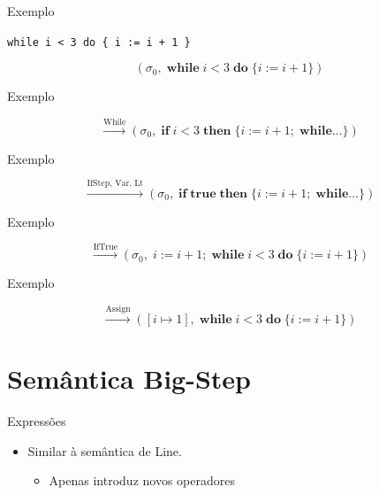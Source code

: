 \begin{frame}[fragile]{Exemplo}

    \texttt{while i < 3 do \{ i := i + 1 \}}

    \[(\sigma_0,\; \mathbf{while}\; i < 3\; \mathbf{do}\; \{i \mathbin{:=} i+1\})\]
\end{frame}

\begin{frame}{Exemplo}

    \[\xrightarrow{\text{While}}
    (\sigma_0,\; \mathbf{if}\; i < 3\; \mathbf{then}\; \{i \mathbin{:=} i+1;\; \mathbf{while}\ldots\})\]
\end{frame}

\begin{frame}{Exemplo}

    \[\xrightarrow{\text{IfStep, Var, Lt}}
    (\sigma_0,\; \mathbf{if}\; \mathbf{true}\; \mathbf{then}\; \{i \mathbin{:=} i+1;\; \mathbf{while}\ldots\})\]
\end{frame}

\begin{frame}{Exemplo}

    \[\xrightarrow{\text{IfTrue}}
    (\sigma_0,\; i \mathbin{:=} i+1;\; \mathbf{while}\; i < 3\; \mathbf{do}\; \{i \mathbin{:=} i+1\})\]
\end{frame}

\begin{frame}{Exemplo}

    \[\xrightarrow{\text{Assign}}
    ([i \mapsto 1],\; \mathbf{while}\; i < 3\; \mathbf{do}\; \{i \mathbin{:=} i+1\})\]
\end{frame}


\section{Semântica Big-Step}\label{semuxe2ntica-big-step}

\begin{frame}{Expressões}

    \begin{itemize}

        \item
        Similar à semântica de Line.

        \begin{itemize}

            \item
            Apenas introduz novos operadores
        \end{itemize}
    \end{itemize}
\end{frame}

